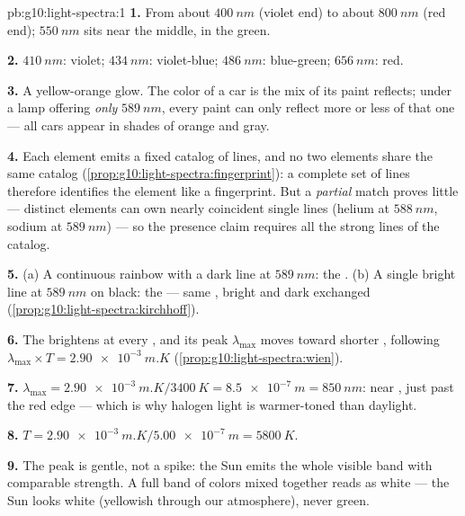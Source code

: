 \begin{solution}{pb:g10:light-spectra:1}
\textbf{1.} From about $\qty{400}{nm}$ (violet end) to about
$\qty{800}{nm}$ (red end); $\qty{550}{nm}$ sits near the middle, in the
green.

\textbf{2.} $\qty{410}{nm}$: violet; $\qty{434}{nm}$: violet-blue;
$\qty{486}{nm}$: blue-green; $\qty{656}{nm}$: red.

\textbf{3.} A  yellow-orange glow. The color of a car is
the mix of  its paint reflects; under a lamp offering
\emph{only} $\qty{589}{nm}$, every paint can only reflect more or less
of that one  --- all cars appear in shades of orange and
gray.

\textbf{4.} Each element emits a fixed catalog of lines, and no two
elements share the same catalog
(\cref{prop:g10:light-spectra:fingerprint}): a complete set of lines
therefore identifies the element like a fingerprint. But a
\emph{partial} match proves little --- distinct elements can own nearly
coincident single lines (helium at $\qty{588}{nm}$, sodium at
$\qty{589}{nm}$) --- so the presence claim requires all the strong lines
of the catalog.

\textbf{5.} (a) A continuous rainbow with a dark line at
$\qty{589}{nm}$: the . (b) A single bright line at
$\qty{589}{nm}$ on black: the  --- same ,
bright and dark exchanged
(\cref{prop:g10:light-spectra:kirchhoff}).

\textbf{6.} The  brightens at every , and its peak
$\lambda_{\max}$ moves toward shorter , following
$\lambda_{\max} \times T = \qty{2.90e-3}{m.K}$
(\cref{prop:g10:light-spectra:wien}).

\textbf{7.} $\lambda_{\max} = \qty{2.90e-3}{m.K} / \qty{3400}{K}
= \qty{8.5e-7}{m} = \qty{850}{nm}$: near , just past the red
edge --- which is why halogen light is warmer-toned than daylight.

\textbf{8.} $T = \qty{2.90e-3}{m.K} / \qty{5.00e-7}{m} = \qty{5800}{K}$.

\textbf{9.} The peak is gentle, not a spike: the Sun emits the whole
visible band with comparable strength. A full band of colors mixed
together reads as white --- the Sun looks white (yellowish through our
atmosphere), never green.


\end{solution}
